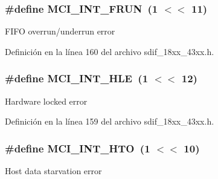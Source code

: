 \subsubsection[{\texorpdfstring{M\+C\+I\+\_\+\+I\+N\+T\+\_\+\+F\+R\+UN}{MCI_INT_FRUN}}]{\setlength{\rightskip}{0pt plus 5cm}\#define M\+C\+I\+\_\+\+I\+N\+T\+\_\+\+F\+R\+UN~(1 $<$$<$ 11)}\hypertarget{group___s_d_i_f__18_x_x__43_x_x_ga994f02807d4a2a7c3ee5439377b2df4c}{}\label{group___s_d_i_f__18_x_x__43_x_x_ga994f02807d4a2a7c3ee5439377b2df4c}
F\+I\+FO overrun/underrun error 

Definición en la línea 160 del archivo sdif\+\_\+18xx\+\_\+43xx.\+h.

\subsubsection[{\texorpdfstring{M\+C\+I\+\_\+\+I\+N\+T\+\_\+\+H\+LE}{MCI_INT_HLE}}]{\setlength{\rightskip}{0pt plus 5cm}\#define M\+C\+I\+\_\+\+I\+N\+T\+\_\+\+H\+LE~(1 $<$$<$ 12)}\hypertarget{group___s_d_i_f__18_x_x__43_x_x_ga85ab64ac3a31eaae9c54f676a74225ea}{}\label{group___s_d_i_f__18_x_x__43_x_x_ga85ab64ac3a31eaae9c54f676a74225ea}
Hardware locked error 

Definición en la línea 159 del archivo sdif\+\_\+18xx\+\_\+43xx.\+h.

\subsubsection[{\texorpdfstring{M\+C\+I\+\_\+\+I\+N\+T\+\_\+\+H\+TO}{MCI_INT_HTO}}]{\setlength{\rightskip}{0pt plus 5cm}\#define M\+C\+I\+\_\+\+I\+N\+T\+\_\+\+H\+TO~(1 $<$$<$ 10)}\hypertarget{group___s_d_i_f__18_x_x__43_x_x_ga5e15cb0f80c0ee9611bc27d7e6fac07c}{}\label{group___s_d_i_f__18_x_x__43_x_x_ga5e15cb0f80c0ee9611bc27d7e6fac07c}
Host data starvation error 


